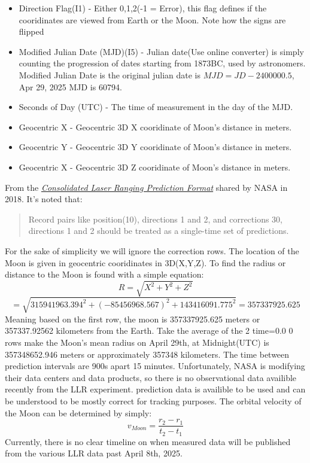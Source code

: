 \documentclass[12pt,oneside,a4paper,english]{article}
\begin{document}
\begin{itemize}
    \item Direction Flag(I1) - Either 0,1,2(-1 = Error), this flag defines if the cooridinates are viewed from Earth or the Moon. Note how the signs are flipped
    \item Modified Julian Date (MJD)(I5) - Julian date(Use online converter) is simply counting the progression of dates starting from 1873BC, used by astronomers. Modified Julian Date is the original julian date is $MJD = JD - 2400000.5$, Apr 29, 2025 MJD is 60794.
    \item Seconds of Day (UTC) - The time of measurement in the day of the MJD.
    \item Geocentric X - Geocentric 3D X cooridinate of Moon's distance in meters.
    \item Geocentric Y - Geocentric 3D Y cooridinate of Moon's distance in meters.
    \item Geocentric X - Geocentric 3D Z cooridinate of Moon's distance in meters.
\end{itemize}
From the \href{https://ilrs.gsfc.nasa.gov/docs/2018/cpf_2.00h-1.pdf}{\textit{Consolidated Laser Ranging Prediction Format}} shared by NASA in 2018. It's noted that: 
\begin{quotation}
    Record pairs like position(10), directions 1 and 2, and corrections 30, directions 1 and 2 should be treated as a single-time set of predictions.
\end{quotation}
For the sake of simplicity we will ignore the correction rows. The location of the Moon is given in geocentric cooridinates in 3D(X,Y,Z). To find the radius or distance to the Moon is found with a simple equation:
\begin{equation}
    R = \sqrt{X^2+Y^2+Z^2} 
\end{equation}
\begin{equation}
    = \sqrt{315941963.394^2+(-85456968.567)^2+143416091.775^2} = 357337925.625
\end{equation}
Meaning based on the first row, the moon is 357337925.625 meters or 357337.92562 kilometers from the Earth. Take the average of the 2 time=0.0 0 rows make the Moon's mean radius on April 29th, at Midnight(UTC) is 357348652.946 meters or approximately 357348 kilometers. The time between prediction intervals are 900s apart 15 minutes. Unfortunately, NASA is modifying their data centers and data products, so there is no observational data availible recently from the LLR experiment. prediction data is availible to be used and can be understood to be mostly correct for tracking purposes. The orbital velocity of the Moon can be determined by simply:
\begin{equation}
    v_{Moon} = \frac{r_2-r_1}{t_2-t_1}
\end{equation}
Currently, there is no clear timeline on when measured data will be published from the various LLR data past April 8th, 2025.
\end{document}
